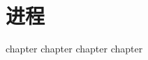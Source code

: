 
\part{进程}
{
    {chapter}
    {chapter}
    {chapter}
    {chapter}
}

\cleardoublepage

\endinput
